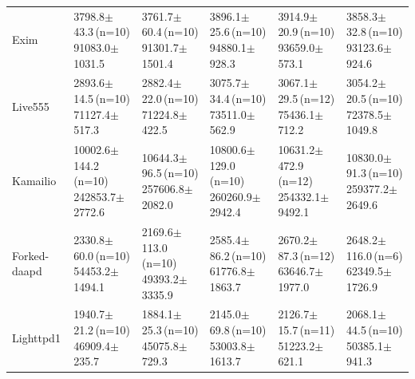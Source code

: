 \documentclass[final,5p,times,number]{elsarticle}
\begin{document}
\begin{table}[!tbp]
\begin{tabularx}{\textwidth}{l *{5}{>{\centering\arraybackslash}X}}
\addlinespace[3pt]
Exim & \shortstack{3798.8$\pm$43.3\,(n=10)\\91083.0$\pm$1031.5} & \shortstack{3761.7$\pm$60.4\,(n=10)\\91301.7$\pm$1501.4} & \shortstack{3896.1$\pm$25.6\,(n=10)\\94880.1$\pm$928.3} & \shortstack{3914.9$\pm$20.9\,(n=10)\\93659.0$\pm$573.1} & \shortstack{3858.3$\pm$32.8\,(n=10)\\93123.6$\pm$924.6} \\
\addlinespace[3pt]
Live555 & \shortstack{2893.6$\pm$14.5\,(n=10)\\71127.4$\pm$517.3} & \shortstack{2882.4$\pm$22.0\,(n=10)\\71224.8$\pm$422.5} & \shortstack{3075.7$\pm$34.4\,(n=10)\\73511.0$\pm$562.9} & \shortstack{3067.1$\pm$29.5\,(n=12)\\75436.1$\pm$712.2} & \shortstack{3054.2$\pm$20.5\,(n=10)\\72378.5$\pm$1049.8} \\
\addlinespace[3pt]
Kamailio & \shortstack{10002.6$\pm$144.2\,(n=10)\\242853.7$\pm$2772.6} & \shortstack{10644.3$\pm$96.5\,(n=10)\\257606.8$\pm$2082.0} & \shortstack{10800.6$\pm$129.0\,(n=10)\\260260.9$\pm$2942.4} & \shortstack{10631.2$\pm$472.9\,(n=12)\\254332.1$\pm$9492.1} & \shortstack{10830.0$\pm$91.3\,(n=10)\\259377.2$\pm$2649.6} \\
\addlinespace[3pt]
Forked-daapd & \shortstack{2330.8$\pm$60.0\,(n=10)\\54453.2$\pm$1494.1} & \shortstack{2169.6$\pm$113.0\,(n=10)\\49393.2$\pm$3335.9} & \shortstack{2585.4$\pm$86.2\,(n=10)\\61776.8$\pm$1863.7} & \shortstack{2670.2$\pm$87.3\,(n=12)\\63646.7$\pm$1977.0} & \shortstack{2648.2$\pm$116.0\,(n=6)\\62349.5$\pm$1726.9} \\
\addlinespace[3pt]
Lighttpd1 & \shortstack{1940.7$\pm$21.2\,(n=10)\\46909.4$\pm$235.7} & \shortstack{1884.1$\pm$25.3\,(n=10)\\45075.8$\pm$729.3} & \shortstack{2145.0$\pm$69.8\,(n=10)\\53003.8$\pm$1613.7} & \shortstack{2126.7$\pm$15.7\,(n=11)\\51223.2$\pm$621.1} & \shortstack{2068.1$\pm$44.5\,(n=10)\\50385.1$\pm$941.3} \\
\bottomrule
\end{tabularx}
\end{table}
\end{document}
